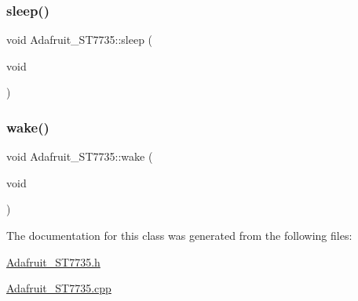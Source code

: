 \subsubsection{\texorpdfstring{sleep()}{sleep()}}
{\footnotesize\ttfamily void Adafruit\+\_\+\+S\+T7735\+::sleep (\begin{DoxyParamCaption}\item[{void}]{ }\end{DoxyParamCaption})\hspace{0.3cm}{\ttfamily [inline]}}

\mbox{\label{class_adafruit___s_t7735_aba13f16e02307bca2b422a8b8e16b754}} 
\subsubsection{\texorpdfstring{wake()}{wake()}}
{\footnotesize\ttfamily void Adafruit\+\_\+\+S\+T7735\+::wake (\begin{DoxyParamCaption}\item[{void}]{ }\end{DoxyParamCaption})\hspace{0.3cm}{\ttfamily [inline]}}



The documentation for this class was generated from the following files\+:\begin{DoxyCompactItemize}
\item 
\hyperlink{_adafruit___s_t7735_8h}{Adafruit\+\_\+\+S\+T7735.\+h}\item 
\hyperlink{_adafruit___s_t7735_8cpp}{Adafruit\+\_\+\+S\+T7735.\+cpp}\end{DoxyCompactItemize}
